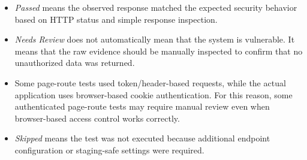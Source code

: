 \begin{itemize}
    \item \textit{Passed} means the observed response matched the expected security behavior based on HTTP status and simple response inspection.
    \item \textit{Needs Review} does not automatically mean that the system is vulnerable. It means that the raw evidence should be manually inspected to confirm that no unauthorized data was returned.
    \item Some page-route tests used token/header-based requests, while the actual application uses browser-based cookie authentication. For this reason, some authenticated page-route tests may require manual review even when browser-based access control works correctly.
    \item \textit{Skipped} means the test was not executed because additional endpoint configuration or staging-safe settings were required.
\end{itemize}